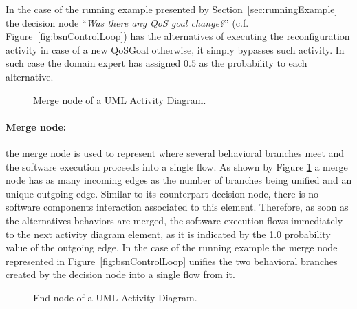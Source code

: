 In the case of the running example presented by Section~\ref{sec:runningExample}
the decision node ``\emph{Was there any QoS goal change?}'' (c.f.
Figure~\ref{fig:bsnControlLoop}) has the alternatives of executing the
reconfiguration activity in case of a new QoSGoal otherwise, it simply bypasses
such activity. In such case the domain expert has assigned $0.5$ as the probability
to each alternative.

\begin{figure}[h!]
\begin{center}
\end{center}
\caption{Merge node of a UML Activity Diagram.}
\label{fig:merge_AD}
\end{figure}

\paragraph{Merge node: \label{par:mergeNodeModeling}} the merge node is used to
represent  where several behavioral branches meet and the software
execution proceeds into a single flow.  As shown by Figure \ref{fig:merge_AD} a
merge node has as many incoming edges as the number of branches being unified
and an unique outgoing edge. Similar to its counterpart decision node, there is
no software components interaction associated to this element. Therefore, as
soon as the alternatives behaviors are merged, the software execution flows
immediately to the next activity diagram element, as it is indicated by the
1.0 probability value of the  outgoing edge.  In the case of the running example
the merge node represented in Figure~\ref{fig:bsnControlLoop} unifies the two
behavioral branches created by the decision node into a single flow from it. 

\begin{figure}[h!]
\begin{center}
\end{center}
\caption{End node of a UML Activity Diagram.}
\label{fig:end_AD}
\end{figure}


